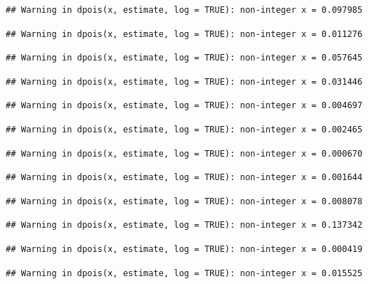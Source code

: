 \documentclass[]{article}
\begin{document}
\begin{verbatim}
## Warning in dpois(x, estimate, log = TRUE): non-integer x = 0.097985
\end{verbatim}

\begin{verbatim}
## Warning in dpois(x, estimate, log = TRUE): non-integer x = 0.011276
\end{verbatim}

\begin{verbatim}
## Warning in dpois(x, estimate, log = TRUE): non-integer x = 0.057645
\end{verbatim}

\begin{verbatim}
## Warning in dpois(x, estimate, log = TRUE): non-integer x = 0.031446
\end{verbatim}

\begin{verbatim}
## Warning in dpois(x, estimate, log = TRUE): non-integer x = 0.004697
\end{verbatim}

\begin{verbatim}
## Warning in dpois(x, estimate, log = TRUE): non-integer x = 0.002465
\end{verbatim}

\begin{verbatim}
## Warning in dpois(x, estimate, log = TRUE): non-integer x = 0.000670
\end{verbatim}

\begin{verbatim}
## Warning in dpois(x, estimate, log = TRUE): non-integer x = 0.001644
\end{verbatim}

\begin{verbatim}
## Warning in dpois(x, estimate, log = TRUE): non-integer x = 0.008078
\end{verbatim}

\begin{verbatim}
## Warning in dpois(x, estimate, log = TRUE): non-integer x = 0.137342
\end{verbatim}

\begin{verbatim}
## Warning in dpois(x, estimate, log = TRUE): non-integer x = 0.000419
\end{verbatim}

\begin{verbatim}
## Warning in dpois(x, estimate, log = TRUE): non-integer x = 0.015525
\end{verbatim}
\end{document}

